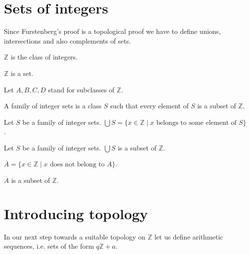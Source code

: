 \documentclass{article}
\newcommand{\Int}{\mathbb{Z}}
\begin{document}
  \section{Sets of integers}

  Since Furstenberg's proof is a topological proof we have to define unions, intersections and also
  complements of sets.

  \begin{forthel}
    \begin{definition}
      $\Int$ is the class of integers.
    \end{definition}

    \begin{axiom}
      $\Int$ is a set.
    \end{axiom}

    Let $A,B,C,D$ stand for subclasses of $\Int$.

    \begin{definition}\label{IntegerSets}
      A family of integer sets is a class $S$ such that every element of $S$ is a subset of $\Int$.
    \end{definition}

    \begin{definition}\label{UnionSet}
      Let $S$ be a family of integer sets.
      $\bigcup S = \{ x \in \Int \mid x \text{ belongs to some element of } S \}$.
    \end{definition}

    \begin{lemma}
      Let $S$ be a family of integer sets.
      $\bigcup S$ is a subset of $\Int$.
    \end{lemma}

    \begin{definition}\label{Complement}
      $\overline{A} = \{ x \in \Int \mid x \text{ does not belong to } A \}$.
    \end{definition}

    \begin{lemma}
      $\overline{A}$ is a subset of $\Int$.
    \end{lemma}
   \end{forthel}


  \section{Introducing topology}

  In our next step towards a suitable topology on $\Int$ let us define arithmetic sequences, i.e.
  sets of the form $q \Int + a$.
\end{document}
